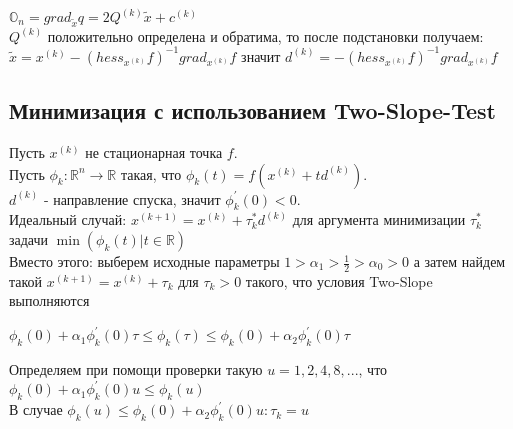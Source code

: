 \checkmark $\mathbb{O}_n=grad_{\tilde{x}}q=2Q^{(k)} \tilde{x}+c^{(k)}$\\

\checkmark $Q^{(k)}$ положительно определена и обратима, то после подстановки получаем:\\

$\tilde{x}=x^{(k)}-(hess_{x^{(k)}}f)^{-1}grad_{x^{(k)}}f$
значит $d^{(k)}=-(hess_{x^{(k)}}f)^{-1}grad_{x^{(k)}}f$\\

\subsection{ Минимизация с использованием Two-Slope-Test }
\checkmark Пусть $x^{(k)}$ не стационарная точка $f$.\\

\checkmark Пусть $\phi_{k}:\mathbb{R}^n \to \mathbb{R}$ такая, что $\phi_{k}(t)=f(x^{(k)}+td^{(k)})$.\\

\checkmark $d^{(k)}$ - направление спуска, значит $\phi^{'}_{k}(0)<0$.\\

\checkmark Идеальный случай: $x^{(k+1)}=x^{(k)}+\tau^{*}_{k}d^{(k)}$ для аргумента минимизации $\tau^{*}_{k}$ задачи $\min( \phi_{k}(t)|t\in\mathbb{R})$\\
\checkmark Вместо этого: выберем исходные параметры $1>\alpha_{1}>\frac{1}{2}>\alpha_{0}>0$ а затем найдем такой $x^{(k+1)}=x^{(k)}+\tau_{k}$ для $\tau_{k}>0$ такого, что условия Two-Slope выполняются\\
\begin{center}$\phi_{k}(0)+\alpha_{1}\phi^{'}_{k}(0)\tau\leq\phi_{k}(\tau)\leq\phi_{k}(0)+\alpha_{2}\phi^{'}_{k}(0)\tau$\end{center}

\checkmark Определяем при помощи проверки такую $u=1,2,4,8,...$, что $\phi_{k}(0)+\alpha_{1}\phi^{'}_{k}(0)u\leq\phi_{k}(u)$\\
\checkmark В случае $\phi_{k}(u)\leq\phi_{k}(0)+\alpha_{2}\phi^{'}_{k}(0)u: \tau_{k}=u$\\

